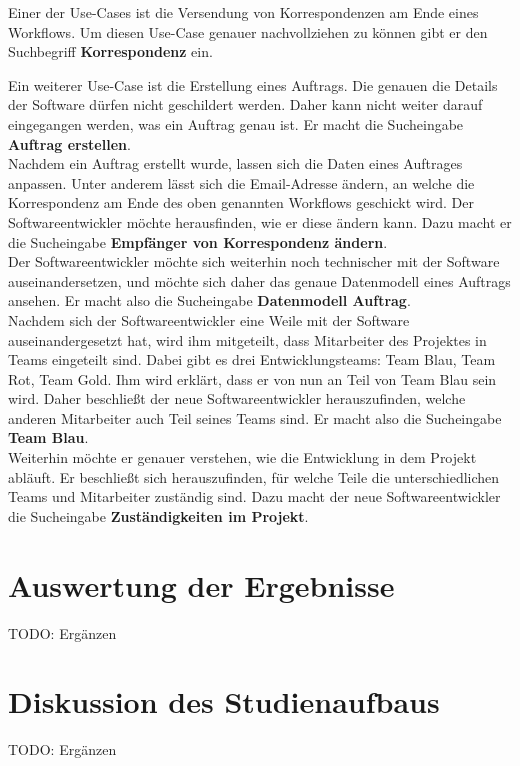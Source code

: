 Einer der Use-Cases ist die Versendung von Korrespondenzen am Ende eines Workflows.
Um diesen Use-Case genauer nachvollziehen zu können gibt er den Suchbegriff \textbf{Korrespondenz} ein.

Ein weiterer Use-Case ist die Erstellung eines Auftrags.
Die genauen die Details der Software dürfen nicht geschildert werden.
Daher kann nicht weiter darauf eingegangen werden, was ein Auftrag genau ist.
Er macht die Sucheingabe \textbf{Auftrag erstellen}.\\

Nachdem ein Auftrag erstellt wurde, lassen sich die Daten eines Auftrages anpassen.
Unter anderem lässt sich die Email-Adresse ändern, an welche die Korrespondenz am Ende des oben genannten Workflows geschickt wird. 
Der Softwareentwickler möchte herausfinden, wie er diese ändern kann.
Dazu macht er die Sucheingabe \textbf{Empfänger von Korrespondenz ändern}.\\

Der Softwareentwickler möchte sich weiterhin noch technischer mit der Software auseinandersetzen, und möchte sich daher das genaue Datenmodell eines Auftrags ansehen.
Er macht also die Sucheingabe \textbf{Datenmodell Auftrag}.\\

Nachdem sich der Softwareentwickler eine Weile mit der Software auseinandergesetzt hat, wird ihm mitgeteilt, dass Mitarbeiter des Projektes in Teams eingeteilt sind.
Dabei gibt es drei Entwicklungsteams: Team Blau, Team Rot, Team Gold.
Ihm wird erklärt, dass er von nun an Teil von Team Blau sein wird.
Daher beschließt der neue Softwareentwickler herauszufinden, welche anderen Mitarbeiter auch Teil seines Teams sind.
Er macht also die Sucheingabe \textbf{Team Blau}.\\

Weiterhin möchte er genauer verstehen, wie die Entwicklung in dem Projekt abläuft.
Er beschließt sich herauszufinden, für welche Teile die unterschiedlichen Teams und Mitarbeiter zuständig sind.
Dazu macht der neue Softwareentwickler die Sucheingabe \textbf{Zuständigkeiten im Projekt}.

\section{Auswertung der Ergebnisse}
TODO: Ergänzen


\section{Diskussion des Studienaufbaus}
TODO: Ergänzen
